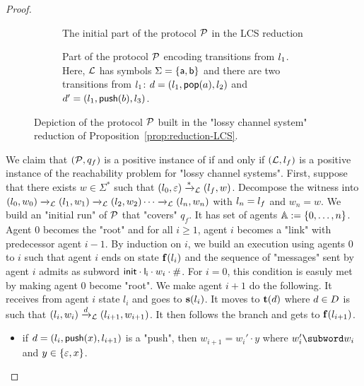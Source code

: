 \begin{proof}
	\begin{figure}
	\begin{subfigure}[b]{0.99\textwidth}
	\centering
	
	\caption{The initial part of the protocol $\mathcal{P}$ in the LCS reduction}\label{fig:lcs-choice}
	\end{subfigure}
	\begin{subfigure}[b]{0.99\textwidth}
	\centering
	
	\caption{Part of the protocol $\mathcal{P}$ encoding transitions from $l_1$. Here, $\mathcal{L}$ has symbols $\Sigma = \{\mathsf{a},\mathsf{b}\}$ and there are two transitions from $l_1$: $d = (l_1, \mathsf{pop}(a), l_2)$ and $d' = (l_1, \mathsf{push}(b), l_3)$.}\label{fig:lcs-trans}
	\end{subfigure}
	\caption{Depiction of the protocol $\mathcal{P}$ built in the "lossy channel system" reduction of Proposition~\ref{prop:reduction-LCS}.}
	\end{figure}
	We claim that $(\mathcal{P}, q_f)$ is a positive instance of \COVER if and only if $(\mathcal{L}, l_f)$ is a positive instance of the reachability problem for "lossy channel systems".
	First, suppose that there exists $w \in \Sigma^*$ such that $(l_0, \varepsilon) \xrightarrow{*}_{\mathcal{L}} (l_f, w)$. Decompose the witness into $(l_0, w_0) \xrightarrow{}_{\mathcal{L}} (l_1, w_1) \xrightarrow{}_{\mathcal{L}} (l_2, w_2) \cdots \xrightarrow{}_{\mathcal{L}} (l_n,w_n)$ with $l_n = l_f$ and $w_n =w$. 
	We build an "initial run" of $\mathcal{P}$ that "covers" $q_f$. It has set of agents $\mathbb{A} := \{0,\dots, n\}$. Agent $0$ becomes the "root" and for all $i \geq 1$, agent $i$ becomes a "link" with predecessor agent $i-1$. By induction on $i$, we build an execution using agents $0$ to $i$ such that agent $i$ ends on state $\mathbf{f}(l_i)$ and the sequence of "messages" sent by agent $i$ admits as subword $\mathsf{init} \cdot \mathsf{l_i} \cdot w_i \cdot \mathsf{\#}$. For $i=0$, this condition is easuly met by making agent $0$ become "root". We make agent $i+1$ do the following. It receives from agent $i$ state $l_i$ and goes to $\mathbf{s}(l_i)$. It moves to $\mathbf{t}(d)$ where $d \in D$ is such that $(l_i, w_i) \xrightarrow{d}_{\mathcal{L}} (l_{i+1}, w_{i+1})$. It then follows the branch and gets to $\mathbf{f}(l_{i+1})$. 
	\begin{itemize}
		\item if $d =(l_i,\mathsf{push}(x), l_{i+1})$ is a "push", then $w_{i+1} = w_{i}' \cdot y$ where $w_i' \subword w_i$ and $y \in \{\varepsilon, x\}$. 

\end{itemize}
\end{proof}
